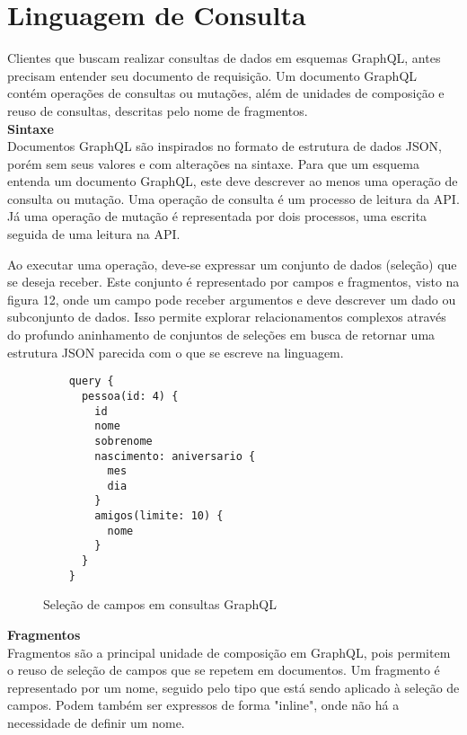 \section[Linguagem de Consulta]{Linguagem de Consulta}

Clientes que buscam realizar consultas de dados em esquemas GraphQL, antes precisam entender seu documento de requisição. Um documento GraphQL contém operações de consultas ou mutações, além de unidades de composição e reuso de consultas, descritas pelo nome de fragmentos. \cite{Facebook2016} \\

\textbf{Sintaxe} \\

Documentos GraphQL são inspirados no formato de estrutura de dados JSON, porém sem seus valores e com alterações na sintaxe. Para que um esquema entenda um documento GraphQL, este deve descrever ao menos uma operação de consulta ou mutação. Uma operação de consulta é um processo de leitura da API. Já uma operação de mutação é representada por dois processos, uma escrita seguida de uma leitura na API.

Ao executar uma operação, deve-se expressar um conjunto de dados (seleção) que se deseja receber. Este conjunto é representado por campos e fragmentos, visto na figura 12, onde um campo pode receber argumentos e deve descrever um dado ou subconjunto de dados. Isso permite explorar relacionamentos complexos através do profundo aninhamento de conjuntos de seleções em busca de retornar uma estrutura JSON parecida com o que se escreve na linguagem.

\begin{figure}[H]
  \centering
  \begin{verbatim}
    query {
      pessoa(id: 4) {
        id
        nome
        sobrenome
        nascimento: aniversario {
          mes
          dia
        }
        amigos(limite: 10) {
          nome
        }
      }
    }
  \end{verbatim}
  \caption{Seleção de campos em consultas GraphQL}
\end{figure}

\textbf{Fragmentos} \\

Fragmentos são a principal unidade de composição em GraphQL, pois permitem o reuso de seleção de campos que se repetem em documentos. Um fragmento é representado por um nome, seguido pelo tipo que está sendo aplicado à seleção de campos. Podem também ser expressos de forma "inline", onde não há a necessidade de definir um nome.

